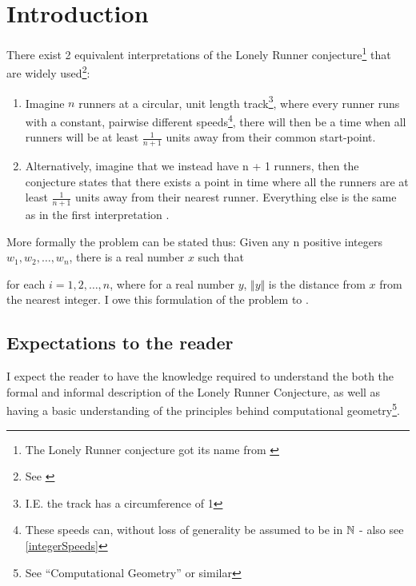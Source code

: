 \section{Introduction}
\label{introduction}

There exist 2 equivalent interpretations of the Lonely Runner conjecture\footnote{The Lonely Runner conjecture got its name from \cite{Bienia97flows.view-obstructions}} that are widely used\footnote{See \cite{ANote}}:
\begin{enumerate}
\item Imagine $n$ runners at a circular, unit length track\footnote{I.E. the track has a circumference of 1}, where every runner runs with a constant, pairwise different speeds\footnote{These speeds can, without loss of generality be assumed to be in $\mathbb{N}$ \cite{Bienia97flows.view-obstructions} - also see \ref{integerSpeeds}}, there will then be a time when all runners will be at least $\frac{1}{n + 1}$ units away from their common start-point.\\

\item Alternatively, imagine that we instead have n + 1 runners, then the conjecture states that there exists a point in time where all the runners are at least $\frac{1}{n + 1}$ units away from their nearest runner. Everything else is the same as in the first interpretation \cite{Bienia97flows.view-obstructions}.\\
\end{enumerate}

More formally the problem can be stated thus: 
Given any n positive integers $w_1, w_2, \ldots, w_n$, there is a real number $x$ such that 

for each $i = 1, 2, \ldots, n$, where for a real number $y$, $\Vert y \Vert$ is the distance from $x$ from the nearest integer. I owe this formulation of the problem to \cite{ANote}.

\subsection{Expectations to the reader}
\label{expectations}
I expect the reader to have the knowledge required to understand the
both the formal and informal description of the Lonely Runner
Conjecture, as well as having a basic understanding of the principles
behind computational geometry\footnote{See ``Computational
  Geometry'' \cite{citeulike:3347056} or similar}.

